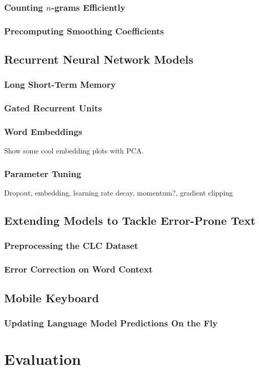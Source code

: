 \documentclass[a4paper, 12pt]{report}
\begin{document}
\subsection{Counting $n$-grams Efficiently}
\subsection{Precomputing Smoothing Coefficients}
\section{Recurrent Neural Network Models}
\subsection{Long Short-Term Memory}
\subsection{Gated Recurrent Units}
\subsection{Word Embeddings}
Show some cool embedding plots with PCA.
\subsection{Parameter Tuning}
Dropout, embedding, learning rate decay, momentum?, gradient clipping
\section{Extending Models to Tackle Error-Prone Text}
\subsection{Preprocessing the CLC Dataset}
\subsection{Error Correction on Word Context}
\section{Mobile Keyboard}
\subsection{Updating Language Model Predictions On the Fly}

\chapter{Evaluation}
\end{document}
